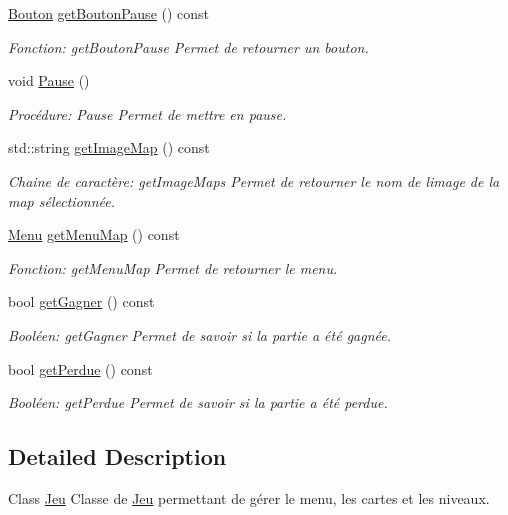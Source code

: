 \begin{DoxyCompactItemize}
\hyperlink{classBouton}{Bouton} \hyperlink{classJeu_a19a19081c6f398937f5a5f9b6d606f1f}{get\+Bouton\+Pause} () const
\begin{DoxyCompactList}\small\item\em Fonction\+: get\+Bouton\+Pause Permet de retourner un bouton. \end{DoxyCompactList}\item 
void \hyperlink{classJeu_a825bd1ef8b91c70e468966f6985a2ee3}{Pause} ()
\begin{DoxyCompactList}\small\item\em Procédure\+: Pause Permet de mettre en pause. \end{DoxyCompactList}\item 
std\+::string \hyperlink{classJeu_aa6c8ca3f336af956e4f7ba9f630c7e30}{get\+Image\+Map} () const
\begin{DoxyCompactList}\small\item\em Chaine de caractère\+: get\+Image\+Maps Permet de retourner le nom de l\textquotesingle{}image de la map sélectionnée. \end{DoxyCompactList}\item 
\hyperlink{classMenu}{Menu} \hyperlink{classJeu_a4cbd54926ccb9f9481643d536378b7c7}{get\+Menu\+Map} () const
\begin{DoxyCompactList}\small\item\em Fonction\+: get\+Menu\+Map Permet de retourner le menu. \end{DoxyCompactList}\item 
bool \hyperlink{classJeu_a4656f397fa4ad510a3e5ecceeb4dcc56}{get\+Gagner} () const
\begin{DoxyCompactList}\small\item\em Booléen\+: get\+Gagner Permet de savoir si la partie a été gagnée. \end{DoxyCompactList}\item 
bool \hyperlink{classJeu_aca82760e6c37895401e1ecaa706014ea}{get\+Perdue} () const
\begin{DoxyCompactList}\small\item\em Booléen\+: get\+Perdue Permet de savoir si la partie a été perdue. \end{DoxyCompactList}\end{DoxyCompactItemize}


\subsection{Detailed Description}
Class \hyperlink{classJeu}{Jeu} Classe de \hyperlink{classJeu}{Jeu} permettant de gérer le menu, les cartes et les niveaux. 

